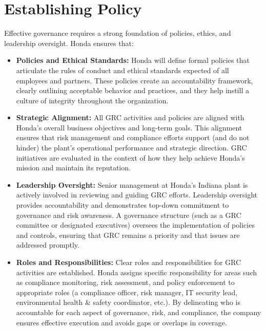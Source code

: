 \section{Establishing Policy}
Effective governance requires a strong foundation of policies, ethics, and leadership oversight. Honda ensures that:
\begin{itemize}
    \item \textbf{Policies and Ethical Standards:} Honda will define formal policies that articulate the rules of conduct and ethical standards expected of all employees and partners. These policies create an accountability framework, clearly outlining acceptable behavior and practices, and they help instill a culture of integrity throughout the organization.
    \item \textbf{Strategic Alignment:} All GRC activities and policies are aligned with Honda's overall business objectives and long-term goals. This alignment ensures that risk management and compliance efforts support (and do not hinder) the plant’s operational performance and strategic direction. GRC initiatives are evaluated in the context of how they help achieve Honda’s mission and maintain its reputation.
    \item \textbf{Leadership Oversight:} Senior management at Honda’s Indiana plant is actively involved in reviewing and guiding GRC efforts. Leadership oversight provides accountability and demonstrates top-down commitment to governance and risk awareness. A governance structure (such as a GRC committee or designated executives) oversees the implementation of policies and controls, ensuring that GRC remains a priority and that issues are addressed promptly.
    \item \textbf{Roles and Responsibilities:} Clear roles and responsibilities for GRC activities are established. Honda assigns specific responsibility for areas such as compliance monitoring, risk assessment, and policy enforcement to appropriate roles (a compliance officer, risk manager, IT security lead, environmental health \& safety coordinator, etc.). By delineating who is accountable for each aspect of governance, risk, and compliance, the company ensures effective execution and avoids gaps or overlaps in coverage.
\end{itemize}

